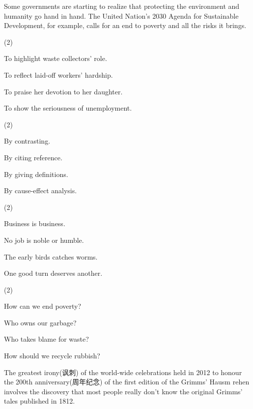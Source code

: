 \documentclass{英语试卷}
\begin{document}
\par Some governments are starting to realize that protecting the environment and humanity go hand in hand. The United Nation's 2030 Agenda for Sustainable Development, for example, calls for an end to poverty and all the risks it brings.\par
{}
\begin{choices}(2)
  \item To highlight waste collectors' role.
  \item To reflect laid-off workers' hardship.
  \item To praise her devotion to her daughter.
  \item To show the seriousness of unemployment.
\end{choices}
\begin{choices}(2)
  \item By contrasting.
  \item By citing reference.
  \item By giving definitions.
  \item By cause-effect analysis.
\end{choices}
\begin{choices}(2)
  \item Business is business.
  \item No job is noble or humble.
  \item The early birds catches worms.
  \item One good turn deserves another.
\end{choices}
\begin{choices}(2)
  \item How can we end poverty?
  \item Who owns our garbage?
  \item Who takes blame for waste?
  \item How should we recycle rubbish?
\end{choices}
\par The greatest irony(讽刺) of the world-wide celebrations held in 2012 to honour the 200th anniversary(周年纪念) of the first edition of the Grimms' Hausm rehen involves the discovery that most people really don't know the original Grimms' tales published in 1812.\par
\end{document}
